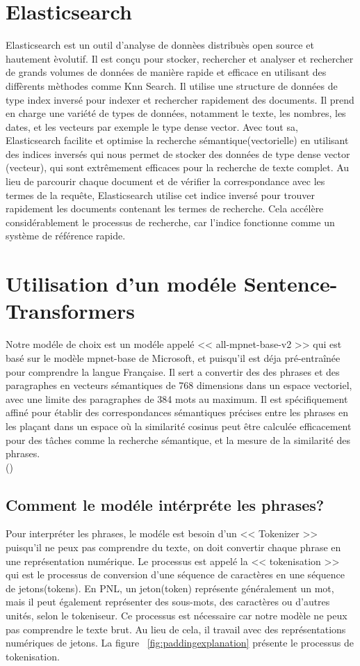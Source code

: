 \section{Elasticsearch}
\noindent
Elasticsearch est un outil d'analyse de donnèes distribuès open source et hautement èvolutif. Il est conçu pour stocker, rechercher et analyser et rechercher de grands volumes de données de manière rapide et efficace en utilisant des diffèrents mèthodes comme Knn Search.
Il utilise une structure de données de type index inversé pour indexer et rechercher rapidement des documents. Il prend en charge une variété de types de données, notamment le texte, les nombres, les dates, et les vecteurs par exemple le type dense vector. Avec tout sa, Elasticsearch facilite et optimise la recherche sémantique(vectorielle) en utilisant des indices inversés qui nous permet de stocker des données de type dense vector (vecteur), qui sont extrêmement efficaces pour la recherche de texte complet. Au lieu de parcourir chaque document et de vérifier la correspondance avec les termes de la requête, Elasticsearch utilise cet indice inversé pour trouver rapidement les documents contenant les termes de recherche. Cela accélère considérablement le processus de recherche, car l'indice fonctionne comme un système de référence rapide.

\section{Utilisation d'un modéle Sentence-Transformers}
\noindent
Notre modéle de choix est un modéle appelé << all-mpnet-base-v2 >> qui est basé sur le modèle mpnet-base de Microsoft, et puisqu'il est déja pré-entraînée pour comprendre la langue Française. Il sert a convertir des des phrases et des paragraphes en vecteurs sémantiques de 768 dimensions dans un espace vectoriel, avec une limite des paragraphes de 384 mots au maximum. Il est spécifiquement affiné pour établir des correspondances sémantiques précises entre les phrases en les plaçant dans un espace où la similarité cosinus peut être calculée efficacement pour des tâches comme la recherche sémantique, et la mesure de la similarité des phrases. \\
 (\cite{pinecone:mpnet})

\subsection{Comment le modéle intérpréte les phrases?}
\noindent
Pour interpréter les phrases, le modéle est besoin d'un << Tokenizer >> puisqu'il ne peux pas comprendre du texte, on doit convertir chaque phrase en une représentation numérique. Le processus est appelé la << tokenisation >> qui est le processus de conversion d'une séquence de caractères en une séquence de jetons(tokens). En PNL, un jeton(token) représente généralement un mot, mais il peut également représenter des sous-mots, des caractères ou d'autres unités, selon le tokeniseur. Ce processus est nécessaire car notre modèle ne peux pas comprendre le texte brut. Au lieu de cela, il travail avec des représentations numériques de jetons. La figure ~\ref{fig:paddingexplanation} présente le processus de tokenisation.


